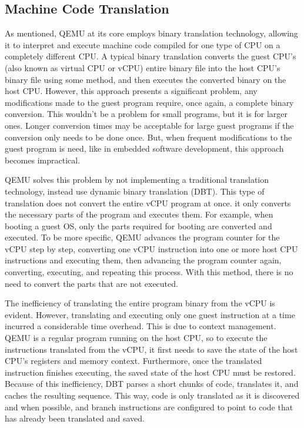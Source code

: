 \subsection{Machine Code Translation}
\label{chap:qemu_translation}

As mentioned, QEMU at its core employs binary translation technology, allowing 
it to interpret and execute machine code compiled for one type of CPU on a 
completely different CPU. A typical binary translation converts the guest CPU's 
(also known as virtual CPU or vCPU) entire binary file into the host CPU's binary file 
using some method, and then executes the converted binary on the host CPU. 
However, this approach presents a significant problem, any modifications made to the 
guest program require, once again, a complete binary conversion. This wouldn't be 
a problem for small programs, but it is for larger ones. Longer conversion times may 
be acceptable for large guest programs if the conversion only needs to be done once. 
But, when frequent modifications to the guest program is need, like in embedded 
software development, this approach becomes impractical.

QEMU solves this problem by not implementing a traditional translation 
technology, instead use dynamic binary translation (DBT). This type of translation 
does not convert the entire vCPU program at once. it only converts the necessary parts 
of the program and executes them. For example, when booting a guest OS, only 
the parts required for booting are converted and executed. To be more specific, 
QEMU advances the program counter for the vCPU step by step, converting one 
vCPU instruction into one or more host CPU instructions and executing them, 
then advancing the program counter again, converting, executing, and repeating 
this process. With this method, there is no need to convert the parts that are 
not executed.

The inefficiency of translating the entire program binary from the vCPU is evident. 
However, translating and executing only one guest instruction at a time 
incurred a considerable time overhead. This is due to context management. 
QEMU is a regular program running on the host CPU, so to execute the instructions 
translated from the vCPU, it first needs to save the state of the host CPU's registers and 
memory context. Furthermore, once the translated instruction finishes executing, 
the saved state of the host CPU must be restored. Because of this inefficiency, 
DBT parses a short chunks of code, translates it, and caches the resulting sequence. 
This way, code is only translated as it is discovered and when possible, and branch 
instructions are configured to point to code that has already been translated and saved.

